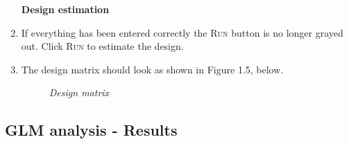 \begin{enumerate}
\textbf{Design estimation}\\
\item If everything has been entered correctly the \textsc{Run} button is no longer grayed out. Click \textsc{Run} to estimate the design.
\item The design matrix should look as shown in Figure 1.5, below.

\begin{figure}[!ht]
\centering{}
\caption{\em Design matrix}
\label{ppi_fig5}
\end{figure}
\end{enumerate}

\subsection{GLM analysis - Results}

